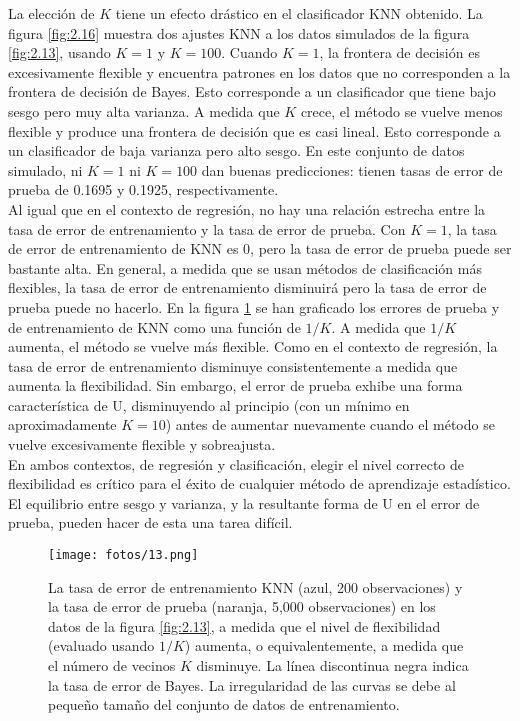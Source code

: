 La elección de $K$ tiene un efecto drástico en el clasificador KNN obtenido. La figura \ref{fig:2.16} muestra dos ajustes KNN a los datos simulados de la figura \ref{fig:2.13}, usando $K = 1$ y $K = 100$. Cuando $K = 1$, la frontera de decisión es excesivamente flexible y encuentra patrones en los datos que no corresponden a la frontera de decisión de Bayes. Esto corresponde a un clasificador que tiene bajo sesgo pero muy alta varianza. A medida que $K$ crece, el método se vuelve menos flexible y produce una frontera de decisión que es casi lineal. Esto corresponde a un clasificador de baja varianza pero alto sesgo. En este conjunto de datos simulado, ni $K = 1$ ni $K = 100$ dan buenas predicciones: tienen tasas de error de prueba de 0.1695 y 0.1925, respectivamente. \\

Al igual que en el contexto de regresión, no hay una relación estrecha entre la tasa de error de entrenamiento y la tasa de error de prueba. Con $K = 1$, la tasa de error de entrenamiento de KNN es 0, pero la tasa de error de prueba puede ser bastante alta. En general, a medida que se usan métodos de clasificación más flexibles, la tasa de error de entrenamiento disminuirá pero la tasa de error de prueba puede no hacerlo. En la figura \ref{fig:2.17} se han graficado los errores de prueba y de entrenamiento de KNN como una función de $1/K$. A medida que $1/K$ aumenta, el método se vuelve más flexible. Como en el contexto de regresión, la tasa de error de entrenamiento disminuye consistentemente a medida que aumenta la flexibilidad. Sin embargo, el error de prueba exhibe una forma característica de U, disminuyendo al principio (con un mínimo en aproximadamente $K = 10$) antes de aumentar nuevamente cuando el método se vuelve excesivamente flexible y sobreajusta. \\

En ambos contextos, de regresión y clasificación, elegir el nivel correcto de flexibilidad es crítico para el éxito de cualquier método de aprendizaje estadístico. El equilibrio entre sesgo y varianza, y la resultante forma de U en el error de prueba, pueden hacer de esta una tarea difícil. 

\begin{figure}[H]
\centering
\texttt{[image: fotos/13.png]}
\caption{La tasa de error de entrenamiento KNN (azul, 200 observaciones) y la tasa de error de prueba (naranja, 5,000 observaciones) en los datos de la figura \ref{fig:2.13}, a medida que el nivel de flexibilidad (evaluado usando $1/K$) aumenta, o equivalentemente, a medida que el número de vecinos $K$ disminuye. La línea discontinua negra indica la tasa de error de Bayes. La irregularidad de las curvas se debe al pequeño tamaño del conjunto de datos de entrenamiento.}
\label{fig:2.17}
\end{figure}